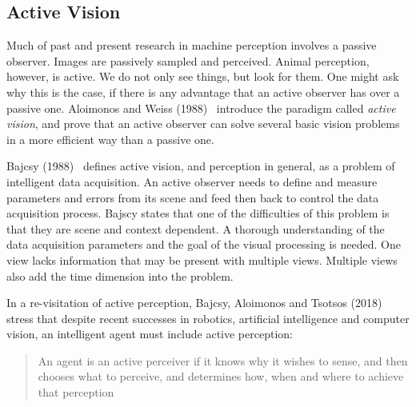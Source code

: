 

%


\subsection{Active Vision}
\label{sec:activevision}


Much of past and present research in machine perception involves a passive observer.
Images are passively sampled and perceived.
Animal perception, however, is active.
We do not only see things, but look for them.
One might ask why this is the case, if there is any advantage that an active observer has over a passive one.
Aloimonos and Weiss (1988)~\cite{aloimonos_active_1988} introduce the paradigm called \textit{active vision}, and prove that an active observer can solve several basic vision problems in a more efficient way than a passive one.

Bajcsy (1988)~\cite{bajcsy_1988} defines active vision, and perception in general, as a problem of intelligent data acquisition.
An active observer needs to define and measure parameters and errors from its scene and feed then back to control the data acquisition process.
Bajscy states that one of the difficulties of this problem is that they are scene and context dependent.
A thorough understanding of the data acquisition parameters and the goal of the visual processing is needed.
One view lacks information that may be present with multiple views.
Multiple views also add the time dimension into the problem.

In a re-visitation of active perception, Bajcsy, Aloimonos and Tsotsos (2018)~\cite{bajcsy_aloimonos_tsotsos_2018} stress that despite recent successes in robotics, artificial intelligence and computer vision, an intelligent agent must include active perception:

\begin{quote}
    An agent is an active perceiver if it knows why it wishes to sense, and then chooses what to perceive, and determines how, when and where to achieve that perception
\end{quote}~\cite{bajcsy_aloimonos_tsotsos_2018}

